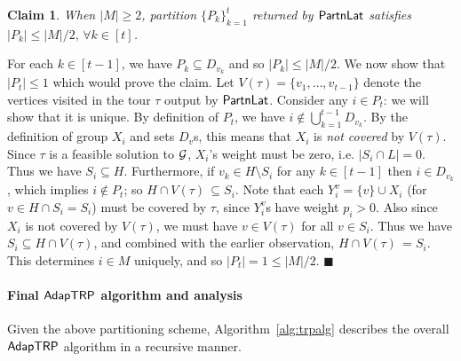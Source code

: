 \documentclass[11pt]{article}
\newtheorem{claim}[thm]{Claim}
\def\sse{\subseteq}
\def\palgl{\ensuremath{{\sf PartnLat}}\xspace}
\def\strp{\ensuremath{{\sf AdapTRP}}\xspace}
\newenvironment{pf}{

\noindent{\bf Proof:}} {\hfill$\blacksquare$


}
\begin{document}
\begin{claim}\label{cl:trp-partn}
When $|M|\ge 2$, partition $\{P_k\}_{k=1}^t$ returned by \palgl satisfies $|P_k|\le |M|/2,\, \forall k\in[t]$.
\end{claim}
\begin{pf}
For each $k\in[t-1]$, we have $P_k\sse D_{v_{k}}$ and so $|P_k|\le |M|/2$. We now show that $|P_t|\le 1$ which would
prove the claim. Let $V(\tau)=\{v_1,\ldots,v_{t-1}\}$ denote the vertices visited in the tour $\tau$ output by \palgl.
Consider any $i\in P_t$: we will show that it is unique. By definition of $P_t$, we have $i\not\in \bigcup_{k=1}^{t-1}
D_{v_k}$. By the definition of group $X_i$ and sets $D_v$s, this means that $X_i$ is {\em not covered} by $V(\tau)$.
Since $\tau$ is a feasible solution to ${\cal G}$, $X_i$'s weight must be zero, i.e. $|S_i\cap L|=0$. Thus we have
$S_i\sse H$. Furthermore, if $v_k\in H\setminus S_i$ for any $k\in[t-1]$ then $i\in D_{v_k}$, which implies
$i\not\in P_t$; so $H\cap V(\tau) \, \sse S_i$. Note that each $Y^v_i=\{v\}\cup X_i$ (for $v\in H\cap S_i=S_i$)
must be covered by $\tau$, since $Y^v_i$s have weight $p_i>0$. Also since $X_i$ is not covered by $V(\tau)$, we must
have $v\in V(\tau)$ for all $v\in S_i$. Thus we have $S_i\sse H\cap V(\tau)$, and combined with the earlier
observation, $H\cap V(\tau)\, = S_i$. This determines $i\in M$ uniquely, and so $|P_t|=1\le |M|/2$.
\end{pf}



\paragraph{Final \strp algorithm and analysis}
Given the above partitioning scheme, Algorithm~\ref{alg:trpalg} describes the overall \strp algorithm in a recursive manner. 
\end{document}
